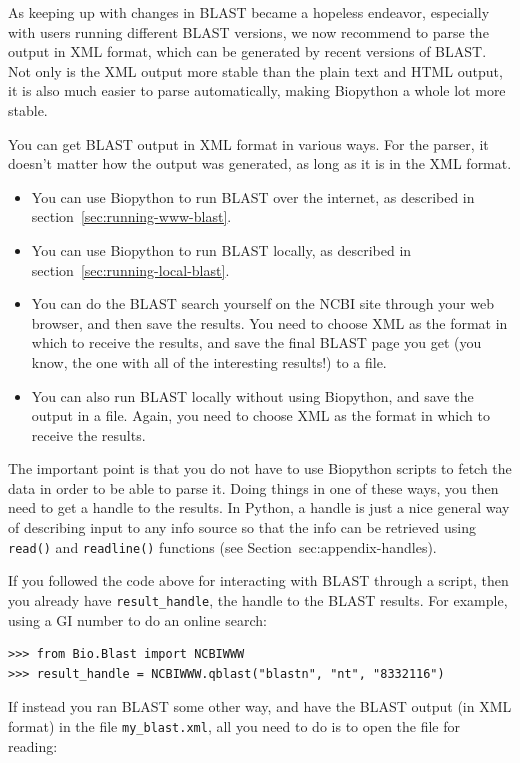 \documentclass{report}
\begin{document}
As keeping up with changes in BLAST
became a hopeless endeavor, especially with users running different BLAST
versions, we now recommend to parse the output in XML format, which can be
generated by recent versions of BLAST. Not only is the XML output more stable
than the plain text and HTML output, it is also much easier to parse
automatically, making Biopython a whole lot more stable.

You can get BLAST output in XML format in various ways. For the parser, it
doesn't matter how the output was generated, as long as it is in the XML format.
\begin{itemize}
\item You can use Biopython to run BLAST over the internet, as described in
section~\ref{sec:running-www-blast}.
\item You can use Biopython to run BLAST locally, as described in
section~\ref{sec:running-local-blast}.
\item You can do the BLAST search yourself on the NCBI site through your
web browser, and then save the results. You need to choose XML as the format
in which to receive the results, and save the final BLAST page you get
(you know, the one with all of the interesting results!) to a file.
\item You can also run BLAST locally without using Biopython, and save
the output in a file. Again, you need to choose XML as the format in which
to receive the results.
\end{itemize}
The important point is that you do not have to use Biopython
scripts to fetch the data in order to be able to parse it.
Doing things in one of these ways, you then need to get a handle
to the results. In Python, a handle is just a nice general way of
describing input to any info source so that the info can be retrieved
using \verb|read()| and \verb|readline()| functions
(see Section~{sec:appendix-handles}).

If you followed the code above for interacting with BLAST through a
script, then you already have \verb|result_handle|, the handle to the
BLAST results.  For example, using a GI number to do an online search:

\begin{verbatim}
>>> from Bio.Blast import NCBIWWW
>>> result_handle = NCBIWWW.qblast("blastn", "nt", "8332116")
\end{verbatim}

If instead you ran BLAST some other way, and have the
BLAST output (in XML format) in the file \verb|my_blast.xml|, all you
need to do is to open the file for reading:
\end{document}
